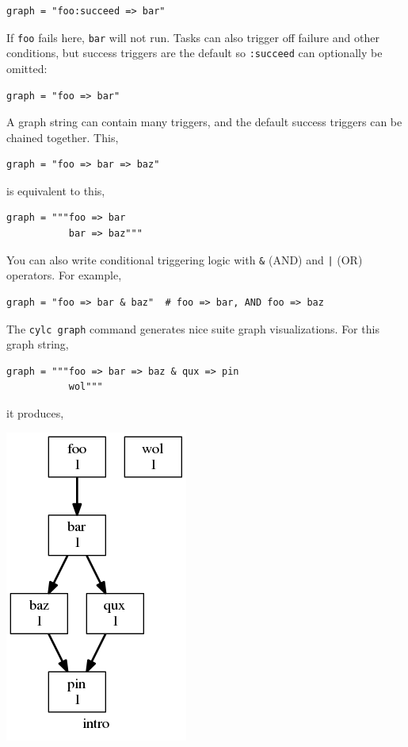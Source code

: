 \begin{lstlisting}[language=suiterc]
graph = "foo:succeed => bar"
\end{lstlisting}

If \lstinline{foo} fails here, \lstinline{bar} will not run.  Tasks can also
trigger off failure and other conditions, but success triggers are the default
so \lstinline=:succeed= can optionally be omitted:

\begin{lstlisting}[language=suiterc]
graph = "foo => bar"
\end{lstlisting}

A graph string can contain many triggers, and the default success triggers can
be chained together. This,

\begin{lstlisting}[language=suiterc]
graph = "foo => bar => baz"
\end{lstlisting}

is equivalent to this,

\begin{lstlisting}[language=suiterc]
graph = """foo => bar
           bar => baz"""
\end{lstlisting}

You can also write conditional triggering logic with \lstinline=&= (AND) and
\lstinline=|= (OR) operators. For example,

\begin{lstlisting}[language=suiterc]
graph = "foo => bar & baz"  # foo => bar, AND foo => baz
\end{lstlisting}

The \lstinline=cylc graph= command generates nice suite graph visualizations.
For this graph string,

\begin{lstlisting}[language=suiterc]
graph = """foo => bar => baz & qux => pin
           wol"""
\end{lstlisting}

it produces,

\begin{center}
\includegraphics[width=0.2\columnwidth]{resources/intro-1.png} %
\end{center}

